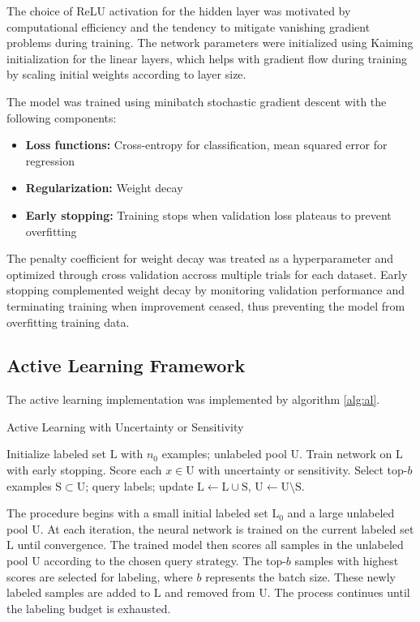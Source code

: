 \documentclass[conference]{IEEEtran}
\newcommand{\set}[1]{\mathrm{#1}}
\begin{document}
The choice of ReLU activation for the hidden layer was motivated by computational efficiency and the tendency to mitigate vanishing gradient problems during training. The network parameters were initialized using Kaiming initialization for the linear layers, which helps with gradient flow during training by scaling initial weights according to layer size.

The model was trained using minibatch stochastic gradient descent with the following components:

\begin{itemize}
\item \textbf{Loss functions:} Cross-entropy for classification, mean squared error for regression
\item \textbf{Regularization:} Weight decay
\item \textbf{Early stopping:} Training stops when validation loss plateaus to prevent overfitting
\end{itemize}

The penalty coefficient for weight decay was treated as a hyperparameter and optimized through cross validation accross multiple trials for each dataset. Early stopping complemented weight decay by monitoring validation performance and terminating training when improvement ceased, thus preventing the model from overfitting training data.

\subsection{Active Learning Framework}

The active learning implementation was implemented by algorithm \ref{alg:al}.

\begin{algorithm}[t]
\caption{Active Learning with Uncertainty or Sensitivity}
\label{alg:al}
\begin{algorithmic}[1]
\State Initialize labeled set $\set{L}$ with $n_0$ examples; unlabeled pool $\set{U}$.
  \State Train network on $\set{L}$ with early stopping.
  \State Score each $x\in \set{U}$ with uncertainty or sensitivity.
  \State Select top-$b$ examples $\set{S}\subset \set{U}$; query labels; update $\set{L}\leftarrow \set{L}\cup \set{S}$, $\set{U}\leftarrow \set{U}\setminus \set{S}$.
\EndWhile
\end{algorithmic}
\end{algorithm}

The procedure begins with a small initial labeled set $\set{L}_0$ and a large unlabeled pool $\set{U}$. At each iteration, the neural network is trained on the current labeled set $\set{L}$ until convergence. The trained model then scores all samples in the unlabeled pool $\set{U}$ according to the chosen query strategy. The top-$b$ samples with highest scores are selected for labeling, where $b$ represents the batch size. These newly labeled samples are added to $\set{L}$ and removed from $\set{U}$. The process continues until the labeling budget is exhausted.
\end{document}
